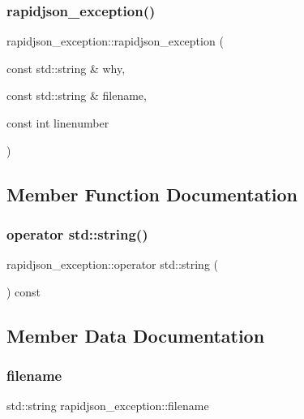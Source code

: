 \subsubsection{\texorpdfstring{rapidjson\+\_\+exception()}{rapidjson\_exception()}}
{\footnotesize\ttfamily rapidjson\+\_\+exception\+::rapidjson\+\_\+exception (\begin{DoxyParamCaption}\item[{const std\+::string \&}]{why,  }\item[{const std\+::string \&}]{filename,  }\item[{const int}]{linenumber }\end{DoxyParamCaption})\hspace{0.3cm}{\ttfamily [inline]}}



\subsection{Member Function Documentation}
\mbox{\label{structrapidjson__exception_afd42d8ce38804d2951ab8cd328cbd9e1}} 
\subsubsection{\texorpdfstring{operator std\+::string()}{operator std::string()}}
{\footnotesize\ttfamily rapidjson\+\_\+exception\+::operator std\+::string (\begin{DoxyParamCaption}{ }\end{DoxyParamCaption}) const\hspace{0.3cm}{\ttfamily [inline]}}



\subsection{Member Data Documentation}
\mbox{\label{structrapidjson__exception_a56bc0e220fc6c7037e877f9f2e3f99f0}} 
\subsubsection{\texorpdfstring{filename}{filename}}
{\footnotesize\ttfamily std\+::string rapidjson\+\_\+exception\+::filename}

